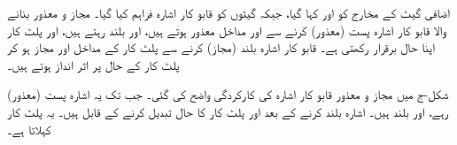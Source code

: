   اضافی گیٹ کے مخارج کو  اور   کہا گیا، جبکہ  گیٹوں  کو قابو کار اشارہ   فراہم کیا گیا۔  مجاز و معذور بنانے والا قابو کار اشارہ   پست (معذور)  کرنے سے  اور  مداخل معذور ہوتے ہیں،  اور  بلند رہتے ہیں،  اور پلٹ کار اپنا حال برقرار رکھتی ہے۔ قابو  کار اشارہ بلند (مجاز) کرنے سے پلٹ کار کے مداخل  اور  مجاز ہو کر پلٹ کار کے حال پر اثر انداز ہوتے  ہیں۔ 
  
  شکل-ج میں مجاز و معذور قابو کار اشارہ  کی کارکردگی واضح کی گئی۔ جب تک یہ اشارہ پست (معذور)  رہے،  اور  بلند  ہیں۔ اشارہ  بلند کرنے کے بعد  اور  پلٹ کار کا حال تبدیل کرنے کے قابل ہیں۔ یہ پلٹ کار  کہلاتا  ہے۔
 
